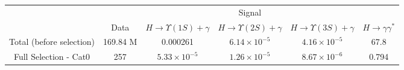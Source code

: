 

\begin{tabular}{c|c|c|c|c|c}
\hline
\hline

&  &  \multicolumn{3}{c|}{Signal} &    \\
\cline{3-5}
& Data & $H \rightarrow \Upsilon(1S)+\gamma$ & $H \rightarrow \Upsilon(2S)+\gamma$ & $H \rightarrow \Upsilon(3S)+\gamma$ &  $H \rightarrow \gamma\gamma^{*}$  \\
\hline
Total (before selection) & 169.84 M &  0.000261 & $6.14 \times 10^{-5}$ & $4.16 \times 10^{-5}$ & 67.8  \\
\hline\hline
Full Selection - Cat0 & 257  &  $5.33 \times 10^{-5}$ &  $1.26 \times 10^{-5}$ &  $8.67 \times 10^{-6}$ &  0.794  \\

\end{tabular}

